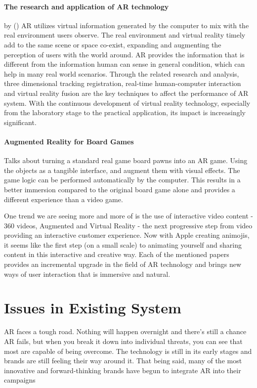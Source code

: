 \documentclass[BTech]{srmuthesis}
\begin{document}
\paragraph{The research and application of AR technology} by (\cite{researchar})
AR utilizes virtual information generated by the computer
to mix with the real environment users observe. The real
environment and virtual reality timely add to the same scene
or space co-exist, expanding and augmenting the perception of
users with the world around. AR provides the information that
is different from the information human can sense in general
condition, which can help in many real world scenarios.
Through the related research and analysis, three dimensional
tracking registration, real-time human-computer
interaction and virtual reality fusion are the key techniques to
affect the performance of AR system. With the continuous
development of virtual reality technology, especially from
the laboratory stage to the practical application, its impact is
increasingly significant.


\paragraph{Augmented Reality for Board Games} Talks about turning a standard real game board pawns into an AR game. Using the objects as a tangible interface, and augment them with visual effects. The game logic can be performed automatically by the computer. This results in a better immersion compared to the original board game alone and provides a different experience than a video game.

One trend we are seeing more and more of is the use of interactive video content - 360 videos, Augmented and Virtual Reality - the next progressive step from video providing an interactive customer experience. Now with Apple creating animojis, it seems like the first step (on a small scale) to animating yourself and sharing content in this interactive and creative way. Each of the mentioned papers provides an incremental upgrade in the field of AR technology and brings new ways of user interaction that is immersive and natural.

\section{Issues in Existing System}
AR faces a tough road. Nothing will happen overnight and there's still a chance AR fails, but when you break it down into individual threats, you can see that most are capable of being overcome. The technology is still in its early stages and brands are still feeling their way around it. That  being said, many of the most innovative and forward-thinking brands have begun to integrate AR into their campaigns
\end{document}
